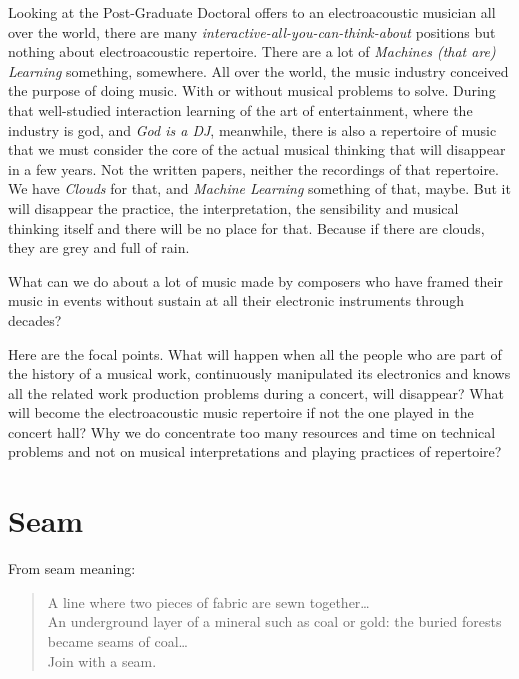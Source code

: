 \documentclass[twoside,a4paper]{article}
\begin{document}
Looking at the Post-Graduate Doctoral offers to an electroacoustic musician all over the world, there are many \emph{interactive-all-you-can-think-about} positions but nothing about electroacoustic repertoire. There are a lot of \emph{Machines (that are) Learning} something, somewhere. All over the world, the music industry conceived the purpose of doing music. With or without musical problems to solve. During that well-studied interaction learning of the art of entertainment, where the industry is god, and \emph{God is a DJ}, meanwhile, there is also a repertoire of music that we must consider the core of the actual musical thinking that will disappear in a few years. Not the written papers, neither the recordings of that repertoire. We have \emph{Clouds} for that, and \emph{Machine Learning} something of that, maybe. But it will disappear the practice, the interpretation, the sensibility and musical thinking itself and there will be no place for that. Because if there are clouds, they are grey and full of rain.

What can we do about a lot of music made by composers who have framed their music in events without sustain at all their electronic instruments through decades?

Here are the focal points. What will happen when all the people who are part of the history of a musical work, continuously manipulated its electronics and knows all the related work production problems during a concert, will disappear? What will become the electroacoustic music repertoire if not the one played in the concert hall? Why we do concentrate too many resources and time on technical problems and not on musical interpretations and playing practices of repertoire?


\section{Seam}
\label{sec:seam}

From seam meaning:

\begin{quote}
A line where two pieces of fabric are sewn together\ldots \\
An underground layer of a mineral such as coal or gold: the buried forests became seams of coal\ldots\\
Join with a seam.
\end{quote}
\end{document}
